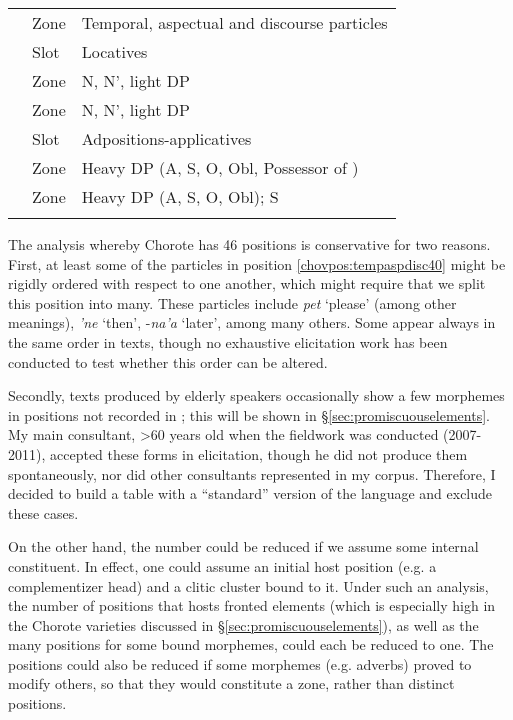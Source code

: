 \documentclass[output=paper]{langscibook}
\begin{document}
\begin{longtable}{Slp{9cm}}
    \label{chovpos:tempaspdisc40}     & Zone & Temporal, aspectual and discourse particles\\
    \label{chovpos:locatives41}     & Slot & Locatives\\
    \label{chovpos:lightDP42}     & Zone & N, N', light DP\\
    \label{chovpos:lightDP43}     & Zone & N, N', light DP\\
    \label{chovpos:adpositionsappl44}     & Slot & Adpositions-applicatives\\
    \label{chovpos:heavyDP45}     & Zone & Heavy DP (A, S, O, Obl, Possessor of \label{chovpos:lightDP46})\\
    \label{chovpos:heavyDP46}     & Zone & Heavy DP (A, S, O, Obl); S\\
\lspbottomrule
\end{longtable}


The analysis whereby Chorote has 46 positions is conservative for two reasons. First, at least some of the particles in position \ref{chovpos:tempaspdisc40} might be rigidly ordered with respect to one another, which might require that we split this position into many. These particles include \textit{pet} `please' (among other meanings), \textit{'ne} `then', -\textit{na'a} `later', among many others. Some appear always in the same order in texts, though no exhaustive elicitation work has been conducted to test whether this order can be altered. 

Secondly, texts produced by elderly speakers occasionally show a few morphemes in positions not recorded in ; this will be shown in §\ref{sec:promiscuouselements}. My main consultant, >60 years old when the fieldwork was conducted (2007-2011), accepted these forms in elicitation, though he did not produce them spontaneously, nor did other consultants represented in my corpus. Therefore, I decided to build a table with a ``standard'' version of the language and exclude these cases.

On the other hand, the number could be reduced if we assume some internal constituent. In effect, one could assume an initial host position (e.g. a complementizer head) and a clitic cluster bound to it. Under such an analysis, the number of positions that hosts fronted elements (which is especially high in the Chorote varieties discussed in §\ref{sec:promiscuouselements}), as well as the many positions for some bound morphemes, could each be reduced to one. The positions could also be reduced if some morphemes (e.g. adverbs) proved to modify others, so that they would constitute a zone, rather than distinct positions. 
\end{document}
